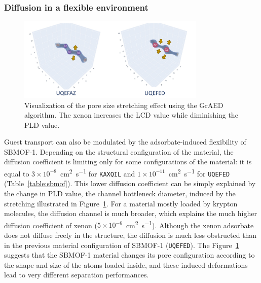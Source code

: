 \documentclass[main]{subfiles}
\begin{document}
\subsubsection{Diffusion in a flexible environment}

\begin{figure}[ht]
  \centering
  \includegraphics[width=0.8\textwidth]{figures/6-perspectives/KAXQIL_stretch.pdf}
  \caption{ Visualization of the pore size stretching effect using the GrAED algorithm. The xenon increases the LCD value while diminishing the PLD value. }\label{fgr:stretch}
\end{figure}

Guest transport can also be modulated by the adsorbate-induced flexibility of SBMOF-1. Depending on the structural configuration of the material, the diffusion coefficient is limiting only for some configurations of the material: it is equal to $3\times10^{-8}$~\si{\square\cm\per\s} for \texttt{KAXQIL} and $1\times10^{-11}$~\si{\square\cm\per\s} for \texttt{UQEFED} (Table~\ref{table:sbmof}). This lower diffusion coefficient can be simply explained by the change in PLD value, the channel bottleneck diameter, induced by the stretching illustrated in Figure~\ref{fgr:stretch}. For a material mostly loaded by krypton molecules, the diffusion channel is much broader, which explains the much higher diffusion coefficient of xenon ($5\times10^{-6}$~\si{\square\cm\per\s}). Although the xenon adsorbate does not diffuse freely in the structure, the diffusion is much less obstructed than in the previous material configuration of SBMOF-1 (\texttt{UQEFED}). The Figure~\ref{fgr:stretch} suggests that the SBMOF-1 material changes its pore configuration according to the shape and size of the atoms loaded inside, and these induced deformations lead to very different separation performances.
\end{document}
